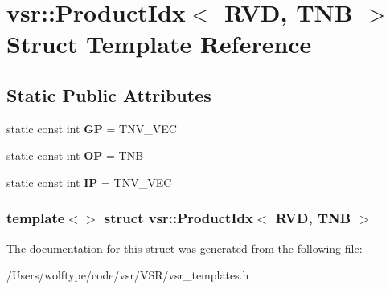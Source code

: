 \hypertarget{structvsr_1_1_product_idx_3_01_r_v_d_00_01_t_n_b_01_4}{\section{vsr\-:\-:Product\-Idx$<$ R\-V\-D, T\-N\-B $>$ Struct Template Reference}
\label{structvsr_1_1_product_idx_3_01_r_v_d_00_01_t_n_b_01_4}
}
\subsection*{Static Public Attributes}
\begin{DoxyCompactItemize}
\item 
\hypertarget{structvsr_1_1_product_idx_3_01_r_v_d_00_01_t_n_b_01_4_a3db1aefb2d6bb9991b92fa3d61e1f951}{static const int {\bfseries G\-P} = T\-N\-V\-\_\-\-V\-E\-C}\label{structvsr_1_1_product_idx_3_01_r_v_d_00_01_t_n_b_01_4_a3db1aefb2d6bb9991b92fa3d61e1f951}

\item 
\hypertarget{structvsr_1_1_product_idx_3_01_r_v_d_00_01_t_n_b_01_4_aeacd75e8db5ff1b2e347d31be4a60c75}{static const int {\bfseries O\-P} = T\-N\-B}\label{structvsr_1_1_product_idx_3_01_r_v_d_00_01_t_n_b_01_4_aeacd75e8db5ff1b2e347d31be4a60c75}

\item 
\hypertarget{structvsr_1_1_product_idx_3_01_r_v_d_00_01_t_n_b_01_4_a77d599c75e74e275e0dd7d0efa448caa}{static const int {\bfseries I\-P} = T\-N\-V\-\_\-\-V\-E\-C}\label{structvsr_1_1_product_idx_3_01_r_v_d_00_01_t_n_b_01_4_a77d599c75e74e275e0dd7d0efa448caa}

\end{DoxyCompactItemize}
\subsubsection*{template$<$$>$ struct vsr\-::\-Product\-Idx$<$ R\-V\-D, T\-N\-B $>$}



The documentation for this struct was generated from the following file\-:\begin{DoxyCompactItemize}
\item 
/\-Users/wolftype/code/vsr/\-V\-S\-R/vsr\-\_\-templates.\-h\end{DoxyCompactItemize}
